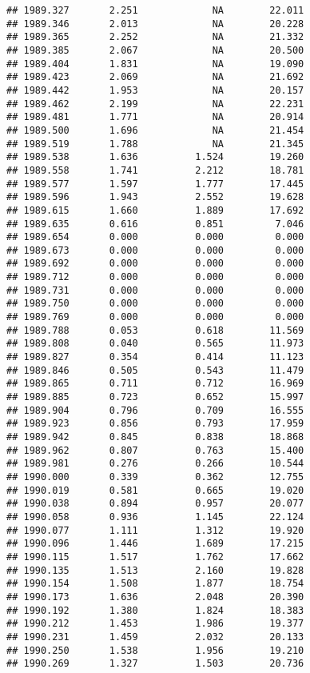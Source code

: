 \documentclass[]{book}
\begin{document}
\begin{verbatim}
## 1989.327       2.251             NA        22.011
## 1989.346       2.013             NA        20.228
## 1989.365       2.252             NA        21.332
## 1989.385       2.067             NA        20.500
## 1989.404       1.831             NA        19.090
## 1989.423       2.069             NA        21.692
## 1989.442       1.953             NA        20.157
## 1989.462       2.199             NA        22.231
## 1989.481       1.771             NA        20.914
## 1989.500       1.696             NA        21.454
## 1989.519       1.788             NA        21.345
## 1989.538       1.636          1.524        19.260
## 1989.558       1.741          2.212        18.781
## 1989.577       1.597          1.777        17.445
## 1989.596       1.943          2.552        19.628
## 1989.615       1.660          1.889        17.692
## 1989.635       0.616          0.851         7.046
## 1989.654       0.000          0.000         0.000
## 1989.673       0.000          0.000         0.000
## 1989.692       0.000          0.000         0.000
## 1989.712       0.000          0.000         0.000
## 1989.731       0.000          0.000         0.000
## 1989.750       0.000          0.000         0.000
## 1989.769       0.000          0.000         0.000
## 1989.788       0.053          0.618        11.569
## 1989.808       0.040          0.565        11.973
## 1989.827       0.354          0.414        11.123
## 1989.846       0.505          0.543        11.479
## 1989.865       0.711          0.712        16.969
## 1989.885       0.723          0.652        15.997
## 1989.904       0.796          0.709        16.555
## 1989.923       0.856          0.793        17.959
## 1989.942       0.845          0.838        18.868
## 1989.962       0.807          0.763        15.400
## 1989.981       0.276          0.266        10.544
## 1990.000       0.339          0.362        12.755
## 1990.019       0.581          0.665        19.020
## 1990.038       0.894          0.957        20.077
## 1990.058       0.936          1.145        22.124
## 1990.077       1.111          1.312        19.920
## 1990.096       1.446          1.689        17.215
## 1990.115       1.517          1.762        17.662
## 1990.135       1.513          2.160        19.828
## 1990.154       1.508          1.877        18.754
## 1990.173       1.636          2.048        20.390
## 1990.192       1.380          1.824        18.383
## 1990.212       1.453          1.986        19.377
## 1990.231       1.459          2.032        20.133
## 1990.250       1.538          1.956        19.210
## 1990.269       1.327          1.503        20.736

\end{verbatim}
\end{document}
